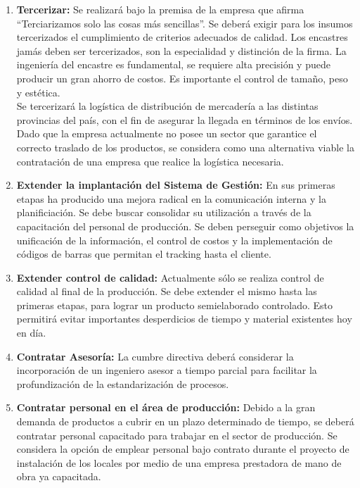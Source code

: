 \documentclass[a4paper,10pt,titlepage]{article}
\begin{document}
\begin{enumerate}
\item \textbf{Tercerizar:} Se realizar\'a bajo la premisa de la empresa que afirma ``Terciarizamos solo las cosas m\'as sencillas''. Se deber\'a exigir para los insumos tercerizados el cumplimiento de criterios adecuados de calidad. Los encastres jam\'as deben ser tercerizados, son la especialidad y distinci\'on de la firma. La ingenier\'ia del encastre es fundamental, se requiere alta precisi\'on y puede producir un gran ahorro de costos. Es importante el control de tama\~no, peso y est\'etica.\\
				Se tercerizar\'a la log\'istica de distribuci\'on de mercader\'ia a las distintas provincias del pa\'is, con el fin de asegurar la llegada en t\'erminos de los env\'ios. Dado que la empresa actualmente no posee un sector que garantice el correcto traslado de los productos, se considera como una alternativa viable la contrataci\'on de una empresa que realice la log\'istica necesaria.

\item \textbf{Extender la implantaci\'on del Sistema de Gesti\'on:} En sus primeras etapas ha producido una mejora radical en la comunicaci\'on interna y la planificiaci\'on. Se debe buscar consolidar su utilizaci\'on a trav\'es de la capacitaci\'on del personal de producci\'on. Se deben perseguir como objetivos la unificaci\'on de la informaci\'on, el control de costos y la implementaci\'on de c\'odigos de barras que permitan el tracking hasta el cliente.

\item \textbf{Extender control de calidad:} Actualmente s\'olo se realiza control de calidad al final de la producci\'on. Se debe extender el mismo hasta las primeras etapas, para lograr un producto semielaborado controlado. Esto permitir\'a evitar importantes desperdicios de tiempo y material existentes hoy en d\'ia.

\item \textbf{Contratar Asesor\'ia:} La cumbre directiva deber\'a considerar la incorporaci\'on de un ingeniero asesor a tiempo parcial para facilitar la profundizaci\'on de la estandarizaci\'on de procesos.

\item \textbf{Contratar personal en el \'area de producci\'on:} Debido a la gran demanda de productos a cubrir en un plazo determinado de tiempo, se deber\'a contratar personal capacitado para trabajar en el sector de producci\'on. Se considera la opci\'on de emplear personal bajo contrato durante el proyecto de instalaci\'on de los locales por medio de una empresa prestadora de mano de obra ya capacitada. 


\end{enumerate}
\end{document}
